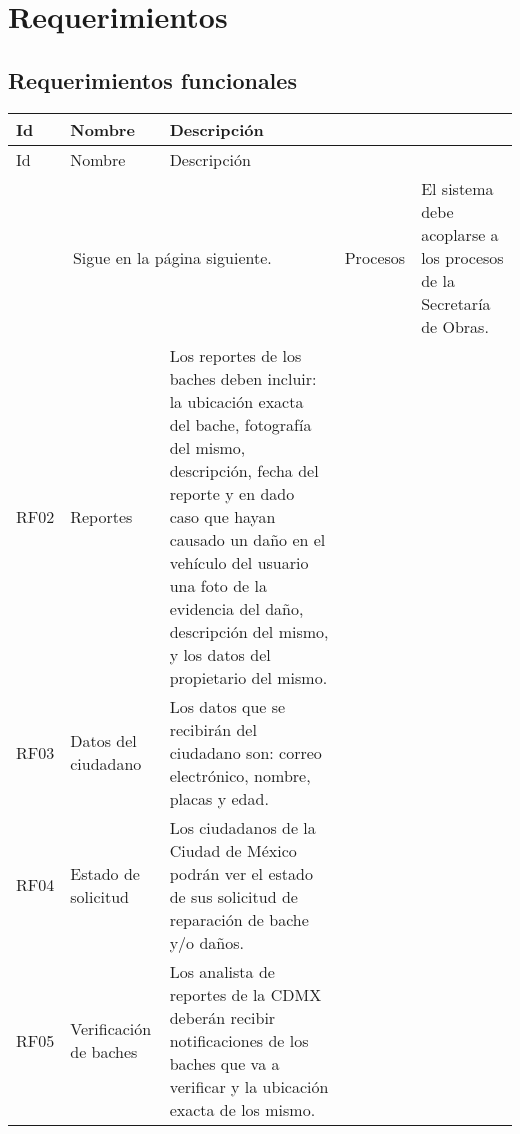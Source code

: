 \chapter{Requerimientos}

\section{Requerimientos funcionales}

\begin{longtable}{|m{1.5cm}|m{3.5cm}|m{7cm}|}
        \rowcolor[HTML]{3531FF} 
        {\color[HTML]{FFFFFF} Id} &{\color[HTML]{FFFFFF}Nombre} & {\color[HTML]{FFFFFF} Descripción}\\
        \hline
        \endfirsthead
        \hline
        \rowcolor[HTML]{3531FF} 
        {\color[HTML]{FFFFFF} Id} &{\color[HTML]{FFFFFF}Nombre} & {\color[HTML]{FFFFFF} Descripción}\\
        \hline 
        \endhead
        \multicolumn{3}{c}{Sigue en la página siguiente.}
        \endfoot
        \endlastfoot
        
        RF01 & Procesos & El sistema debe acoplarse a los procesos de la Secretaría de Obras. \\ \hline
        
        RF02 & Reportes & Los reportes de los baches deben incluir: la ubicación exacta del bache, fotografía del mismo, descripción, fecha del reporte y en dado caso que hayan causado un daño en el vehículo del usuario una foto de la evidencia del daño, descripción del mismo, y los datos del propietario del mismo.  \\ \hline
        RF03 & Datos del ciudadano & Los datos que se recibirán del ciudadano son: correo electrónico, nombre, placas y edad.  \\ \hline
        
        RF04 & Estado de solicitud & Los ciudadanos de la Ciudad de México podrán ver el estado de sus solicitud de reparación de bache y/o daños.\\ \hline
        
        RF05 & Verificación de baches &  Los analista de reportes de la CDMX  deberán recibir notificaciones de los baches que va a verificar y la ubicación exacta de los mismo.  \\ \hline
        

\end{longtable}
